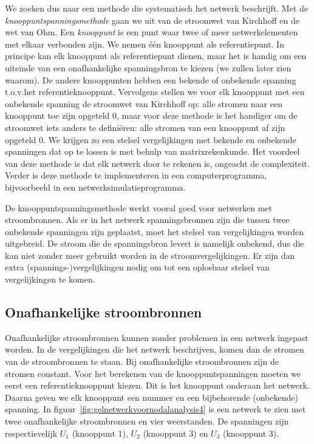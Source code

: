 We zoeken dus naar een methode die systematisch het netwerk beschrijft. Met de \textsl{knooppuntspanningsmethode} gaan we uit van de stroomwet van Kirchhoff en de wet van Ohm. Een \textsl{knooppunt} is een punt waar twee of meer netwerkelementen met elkaar verbonden zijn. We nemen één knooppunt als referentiepunt. In principe kan elk knooppunt als referentiepunt dienen, maar het is handig om een uiteinde van een onafhankelijke spanningsbron te kiezen (we zullen later zien waarom). De andere knooppunten hebben een bekende of onbekende spanning t.o.v.\@ het referentieknooppunt. Vervolgens stellen we voor elk knooppunt met een onbekende spanning de stroomwet van Kirchhoff op: alle stromen naar een knooppunt toe zijn opgeteld 0, maar voor deze methode is het handiger om de stroomwet iets anders te definiëren: alle stromen van een knooppunt af zijn opgeteld 0. We krijgen zo een stelsel vergelijkingen met bekende en onbekende spanningen dat op te lossen is met behulp van matrixrekenkunde. Het voordeel van deze methode is dat elk netwerk door te rekenen is, ongeacht de complexiteit. Verder is deze methode te implementeren in een computerprogramma, bijvoorbeeld in een netwerksimulatieprogramma.

De knooppuntspanningsmethode werkt vooral goed voor netwerken met stroombronnen. Als er in het netwerk spanningsbronnen zijn die tussen twee onbekende spanningen zijn geplaatst, moet het stelsel van vergelijkingen worden uitgebreid. De stroom die de spanningsbron levert is namelijk onbekend, dus die kan niet zonder meer gebruikt worden in de stroomvergelijkingen. Er zijn dan extra (spannings-)vergelijkingen nodig om tot een oplosbaar stelsel van vergelijkingen te komen.

\subsection{Onafhankelijke stroombronnen}
Onafhankelijke stroombronnen kunnen zonder problemen in een netwerk ingepast worden. In de vergelijkingen die het netwerk beschrijven, komen dan de stromen van de stroombronnen te staan. Bij onafhankelijke stroombronnen zijn de stromen constant. Voor het berekenen van de knooppuntspanningen moeten we eerst een referentieknooppunt kiezen. Dit is het knooppunt onderaan het netwerk. Daarna geven we elk knooppunt een nummer en een bijbehorende (onbekende) spanning. In figuur~\ref{fig:gelnetwerkvoornodalanalysis4} is een netwerk te zien met twee onafhankelijke stroombronnen en vier weerstanden. De spanningen zijn respectievelijk $U_1$ (knooppunt 1), $U_2$ (knooppunt 3) en $U_3$ (knooppunt 3).


